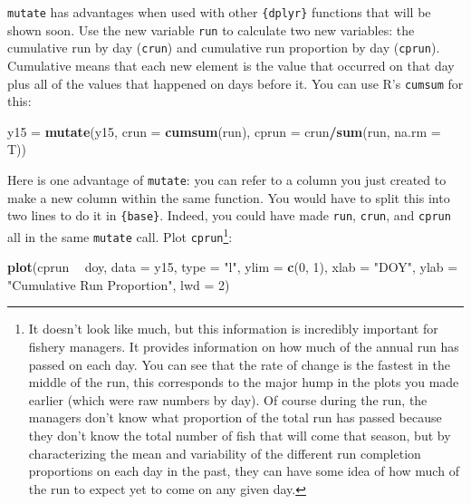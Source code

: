 \documentclass[]{book}
\newenvironment{Shaded}{\begin{snugshade}}{\end{snugshade}}
\newcommand{\KeywordTok}[1]{\textcolor[rgb]{0.13,0.29,0.53}{\textbf{#1}}}
\newcommand{\DataTypeTok}[1]{\textcolor[rgb]{0.13,0.29,0.53}{#1}}
\newcommand{\DecValTok}[1]{\textcolor[rgb]{0.00,0.00,0.81}{#1}}
\newcommand{\StringTok}[1]{\textcolor[rgb]{0.31,0.60,0.02}{#1}}
\newcommand{\OperatorTok}[1]{\textcolor[rgb]{0.81,0.36,0.00}{\textbf{#1}}}
\newcommand{\NormalTok}[1]{#1}
\let\rmarkdownfootnote\footnote%
\def\footnote{\protect\rmarkdownfootnote}
\theoremstyle{definition}
\theoremstyle{definition}
\theoremstyle{definition}
\theoremstyle{remark}
\begin{document}
\texttt{mutate} has advantages when used with other \texttt{\{dplyr\}}
functions that will be shown soon. Use the new variable \texttt{run} to
calculate two new variables: the cumulative run by day (\texttt{crun})
and cumulative run proportion by day (\texttt{cprun}). Cumulative means
that each new element is the value that occurred on that day plus all of
the values that happened on days before it. You can use R's
\texttt{cumsum} for this:

\begin{Shaded}
\begin{Highlighting}[]
\NormalTok{y15 =}\StringTok{ }\KeywordTok{mutate}\NormalTok{(y15, }\DataTypeTok{crun =} \KeywordTok{cumsum}\NormalTok{(run), }\DataTypeTok{cprun =}\NormalTok{ crun}\OperatorTok{/}\KeywordTok{sum}\NormalTok{(run, }\DataTypeTok{na.rm =}\NormalTok{ T))}
\end{Highlighting}
\end{Shaded}

Here is one advantage of \texttt{mutate}: you can refer to a column you
just created to make a new column within the same function. You would
have to split this into two lines to do it in \texttt{\{base\}}. Indeed,
you could have made \texttt{run}, \texttt{crun}, and \texttt{cprun} all
in the same \texttt{mutate} call. Plot \texttt{cprun}\footnote{It
  doesn't look like much, but this information is incredibly important
  for fishery managers. It provides information on how much of the
  annual run has passed on each day. You can see that the rate of change
  is the fastest in the middle of the run, this corresponds to the major
  hump in the plots you made earlier (which were raw numbers by day). Of
  course during the run, the managers don't know what proportion of the
  total run has passed because they don't know the total number of fish
  that will come that season, but by characterizing the mean and
  variability of the different run completion proportions on each day in
  the past, they can have some idea of how much of the run to expect yet
  to come on any given day.}:

\begin{Shaded}
\begin{Highlighting}[]
\KeywordTok{plot}\NormalTok{(cprun }\OperatorTok{~}\StringTok{ }\NormalTok{doy, }\DataTypeTok{data =}\NormalTok{ y15, }\DataTypeTok{type =} \StringTok{"l"}\NormalTok{, }\DataTypeTok{ylim =} \KeywordTok{c}\NormalTok{(}\DecValTok{0}\NormalTok{, }\DecValTok{1}\NormalTok{),}
     \DataTypeTok{xlab =} \StringTok{"DOY"}\NormalTok{, }\DataTypeTok{ylab =} \StringTok{"Cumulative Run Proportion"}\NormalTok{, }\DataTypeTok{lwd =} \DecValTok{2}\NormalTok{)}
\end{Highlighting}
\end{Shaded}
\end{document}
